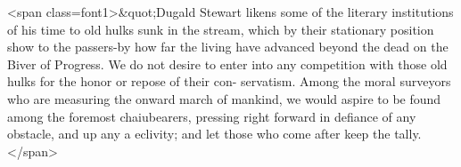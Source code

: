 <span class=font1>&quot;Dugald Stewart likens some of the literary institutions of his time
to old hulks sunk in the stream, which by their stationary position
show to the passers-by how far the living have advanced beyond the
dead on the Biver of Progress. We do not desire to enter into any
competition with those old hulks for the honor or repose of their con-
servatism. Among the moral surveyors who are measuring the onward
march of mankind, we would aspire to be found among the foremost
chaiubearers, pressing right forward in defiance of any obstacle, and
up any a eclivity; and let those who come after keep the tally.</span>
